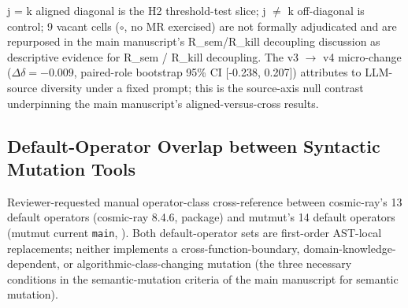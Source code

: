 \documentclass[manuscript,screen,review]{acmart}
\begin{document}
j = k aligned diagonal is the H2 threshold-test slice; j $\neq$ k
off-diagonal is control; 9 vacant cells ($\circ$, no MR exercised) are not formally
adjudicated and are repurposed in the main manuscript's R\_sem/R\_kill decoupling discussion as descriptive evidence for
R\_sem / R\_kill decoupling. The v3 $\to$ v4 micro-change
($\Delta\delta = -0.009$, paired-role bootstrap 95\% CI [-0.238, 0.207])
attributes to LLM-source diversity under a fixed prompt; this is the
source-axis null contrast underpinning the main manuscript's aligned-versus-cross results.

\subsection{Default-Operator Overlap between Syntactic Mutation Tools}\label{b.6-mutmut-vs-cosmic-ray-default-operator-overlap}

Reviewer-requested manual operator-class cross-reference between
cosmic-ray's 13 default operators (cosmic-ray 8.4.6,
 package) and mutmut's 14 default
operators (mutmut current \texttt{main},
). Both default-operator sets
are first-order AST-local replacements; neither implements a
cross-function-boundary, domain-knowledge-dependent, or
algorithmic-class-changing mutation (the three necessary conditions in the semantic-mutation criteria of the main manuscript
for semantic mutation).
\end{document}
